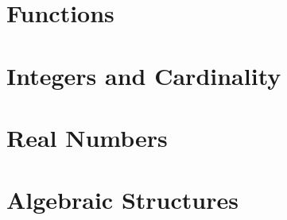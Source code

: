 \documentclass[10pt]{article}
\begin{document}
\newpage
\section{Functions}
\section{Integers and Cardinality}
\section{Real Numbers}
\section{Algebraic Structures}
\hindex
\end{document}
